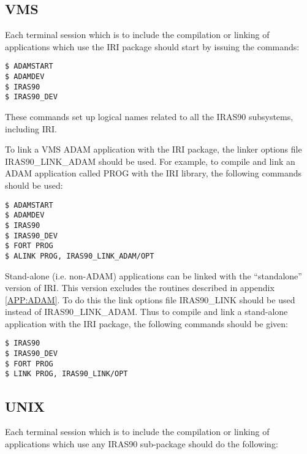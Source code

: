 \subsection{VMS}
Each terminal session which is to include the compilation or linking of 
applications which use the IRI package should start by issuing the commands:

\begin{verbatim}
$ ADAMSTART
$ ADAMDEV
$ IRAS90
$ IRAS90_DEV
\end{verbatim}

These commands set up logical names related to all the IRAS90
subsystems, including IRI. 

To link a VMS ADAM application with the IRI package, the linker options file
IRAS90\_LINK\_ADAM should be used. For example, to compile and link an ADAM
application called PROG with the IRI library, the following commands should be
used: 

\begin{verbatim}
$ ADAMSTART
$ ADAMDEV
$ IRAS90
$ IRAS90_DEV
$ FORT PROG
$ ALINK PROG, IRAS90_LINK_ADAM/OPT 
\end{verbatim}

Stand-alone (i.e. non-ADAM) applications can be linked with the ``standalone''
version of IRI. This version excludes the routines described in appendix
\ref{APP:ADAM}. To do this the link options file IRAS90\_LINK should be used
instead of IRAS90\_LINK\_ADAM. Thus to compile and link a stand-alone
application with the IRI package, the following commands should be given: 

\begin{verbatim}
$ IRAS90
$ IRAS90_DEV
$ FORT PROG
$ LINK PROG, IRAS90_LINK/OPT 
\end{verbatim}

\subsection{UNIX}


Each terminal session which is to include the compilation or linking of 
applications which use any IRAS90 sub-package should do the following:


